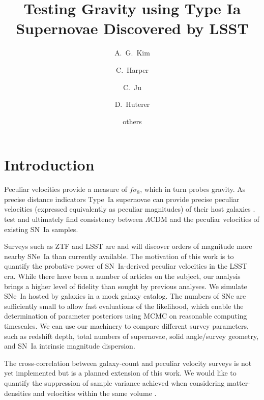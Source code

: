 \documentclass{aastex62}   	%
\begin{document}
\title{Testing Gravity using Type Ia Supernovae Discovered by LSST}
\author[0000-0001-6315-8743]{A.~G.~Kim}
\author{C.~Harper}
\author{C.~Ju}
\author{D.~Huterer}

\author{others}



\section{Introduction}
Peculiar velocities provide a measure of $f\sigma_8$, which in turn probes gravity.  As precise distance indicators Type~Ia supernovae
can provide precise peculiar velocities (expressed equivalently as peculiar magnitudes)
of their host galaxies \citep{2006PhRvD..73l3526H,2011ApJ...741...67D}.
\citet{2015JCAP...12..033H, 2017JCAP...05..015H}  test and ultimately find consistency between
$\Lambda$CDM and the peculiar velocities of existing SN~Ia samples.

Surveys such as ZTF and LSST are and will discover orders of magnitude more nearby SNe~Ia than currently available.
The motivation of this work is to quantify the probative power of SN~Ia-derived peculiar velocities in the LSST era.
While there have been a number of articles on the subject,
our analysis brings a higher level of fidelity than sought by previous analyses.  We simulate SNe~Ia hosted by galaxies in a mock galaxy
catalog. The numbers of SNe are sufficiently small to allow fast evaluations of the likelihood, which enable the determination of parameter
posteriors using MCMC on reasonable computing timescales.   We can use our machinery to 
compare different survey parameters, such as redshift depth, total numbers of supernovae,
solid angle/survey geometry, and SN~Ia intrinsic magnitude dispersion.

The cross-correlation between galaxy-count and peculiar velocity surveys is not yet implemented but is a planned extension of this work.  We would like to
quantify the suppression of sample variance achieved when considering matter-densities and velocities 
within the same volume \citep{2007PhRvL..99h1301G}.
\end{document}
